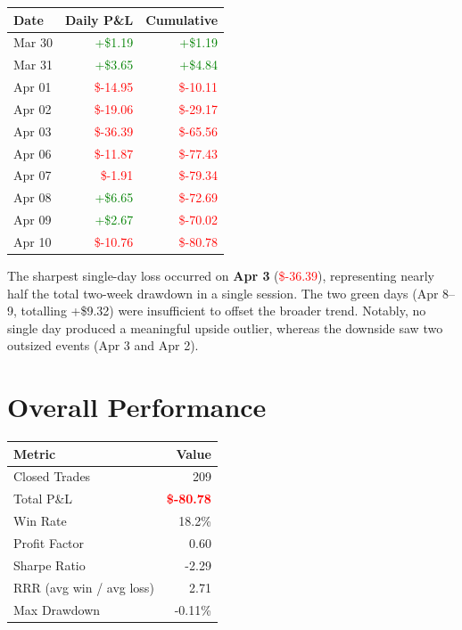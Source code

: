 \documentclass[11pt,a4paper]{article}
\begin{document}
\begin{tabularx}{0.7\linewidth}{L R R}
  \toprule
  \textbf{Date} & \textbf{Daily P\&L} & \textbf{Cumulative} \\
  \midrule
   Mar 30 & \textcolor{green}{+\$1.19}   & \textcolor{green}{+\$1.19}   \\
   Mar 31 & \textcolor{green}{+\$3.65}   & \textcolor{green}{+\$4.84}   \\
   Apr 01 & \textcolor{red}{\$-14.95}  & \textcolor{red}{\$-10.11}  \\
   Apr 02 & \textcolor{red}{\$-19.06}  & \textcolor{red}{\$-29.17}  \\
   Apr 03 & \textcolor{red}{\$-36.39}  & \textcolor{red}{\$-65.56}  \\
   Apr 06 & \textcolor{red}{\$-11.87}  & \textcolor{red}{\$-77.43}  \\
   Apr 07 & \textcolor{red}{\$-1.91}   & \textcolor{red}{\$-79.34}  \\
   Apr 08 & \textcolor{green}{+\$6.65}  & \textcolor{red}{\$-72.69}  \\
   Apr 09 & \textcolor{green}{+\$2.67}  & \textcolor{red}{\$-70.02}  \\
   Apr 10 & \textcolor{red}{\$-10.76}  & \textcolor{red}{\$-80.78}  \\
  \bottomrule
\end{tabularx}

The sharpest single-day loss occurred on \textbf{Apr 3} (\textcolor{red}{\$-36.39}), representing nearly half the total two-week drawdown in a single session. The two green days (Apr 8--9, totalling +\$9.32) were insufficient to offset the broader trend. Notably, no single day produced a meaningful upside outlier, whereas the downside saw two outsized events (Apr 3 and Apr 2).

\section{Overall Performance}

\begin{tabularx}{0.6\linewidth}{L R}
  \toprule
  \textbf{Metric} & \textbf{Value} \\
  \midrule
   Closed Trades  & 209 \\
   Total P\&L     & \textcolor{red}{\textbf{\$-80.78}} \\
   Win Rate       & 18.2\% \\
   Profit Factor  & 0.60 \\
   Sharpe Ratio   & -2.29 \\
   RRR (avg win / avg loss) & 2.71 \\
   Max Drawdown   & -0.11\% \\
  \bottomrule
\end{tabularx}
\end{document}
